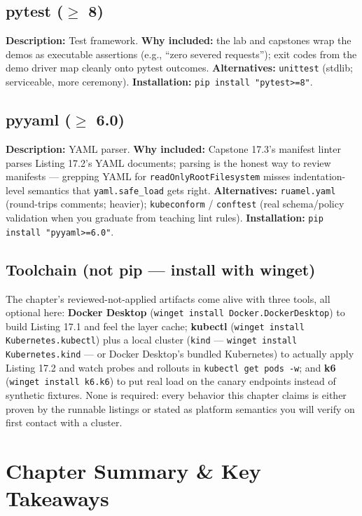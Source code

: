\subsection{pytest ($\geq$ 8)}
\textbf{Description:} Test framework. \textbf{Why included:} the lab and
capstones wrap the demos as executable assertions (e.g., ``zero severed
requests''); exit codes from the demo driver map cleanly onto pytest
outcomes. \textbf{Alternatives:} \texttt{unittest} (stdlib; serviceable,
more ceremony). \textbf{Installation:} \texttt{pip install "pytest>=8"}.

\subsection{pyyaml ($\geq$ 6.0)}
\textbf{Description:} YAML parser. \textbf{Why included:} Capstone 17.3's
manifest linter parses Listing 17.2's YAML documents; parsing is the
honest way to review manifests --- grepping YAML for
\texttt{readOnlyRootFilesystem} misses indentation-level semantics that
\texttt{yaml.safe\_load} gets right. \textbf{Alternatives:}
\texttt{ruamel.yaml} (round-trips comments; heavier); \texttt{kubeconform}
/ \texttt{conftest} (real schema/policy validation when you graduate from
teaching lint rules). \textbf{Installation:}
\texttt{pip install "pyyaml>=6.0"}.

\subsection*{Toolchain (not pip --- install with winget)}
The chapter's reviewed-not-applied artifacts come alive with three tools,
all optional here: \textbf{Docker Desktop}
(\texttt{winget install Docker.DockerDesktop}) to build Listing 17.1 and
feel the layer cache; \textbf{kubectl}
(\texttt{winget install Kubernetes.kubectl}) plus a local cluster
(\texttt{kind} --- \texttt{winget install Kubernetes.kind} --- or Docker
Desktop's bundled Kubernetes) to actually apply Listing 17.2 and watch
probes and rollouts in \texttt{kubectl get pods -w}; and \textbf{k6}
(\texttt{winget install k6.k6}) to put real load on the canary endpoints
instead of synthetic fixtures. None is required: every behavior this
chapter claims is either proven by the runnable listings or stated as
platform semantics you will verify on first contact with a cluster.

\section{Chapter Summary \& Key Takeaways}
\label{sec:ch17-summary}

